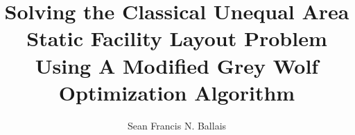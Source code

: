 \documentclass[letterpaper,12pt]{report}
\newlength{\defbaselineskip}
\newcommand{\setlinespacing}[1]%
           {\setlength{\baselineskip}{#1 \defbaselineskip}}
\theoremstyle{plain}
\theoremstyle{definition}
\theoremstyle{remark}
\numberwithin{equation}{section}
\begin{document}

\permissionfalse



\title{Solving the Classical Unequal Area Static Facility Layout Problem Using A Modified Grey Wolf Optimization Algorithm}

\bs
\author{Sean Francis N. Ballais}

{
\beforepreface
{} %
}

{

}
{

}
\tableofcontentspage

\afterpreface
\def\baselinestretch{1}
\setlinespacing{1.66}
{
%
}
\setlinespacing{1.66}











\setlinespacing{1.44}


\end{document}
